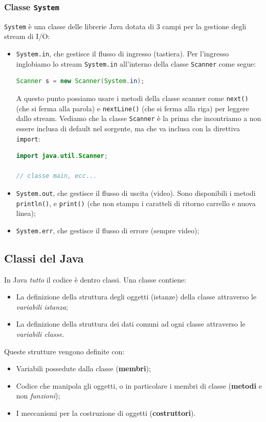 \documentclass[a4paper,11pt]{article}
\begin{document}
\subsubsection{Classe \lstinline|System|}
\lstinline|System| è una classe delle librerie Java dotata di 3 campi per la gestione degli stream di I/O:
\begin{itemize}
	\item \lstinline|System.in|, che gestisce il flusso di ingresso (tastiera).
		Per l'ingresso inglobiamo lo stream \lstinline|System.in| all'interno della classe \lstinline|Scanner| come segue:
\begin{lstlisting}[language=java, style=codestyle]	
Scanner s = new Scanner(System.in);
\end{lstlisting}
A questo punto possiamo usare i metodi della classe scanner come \lstinline|next()| (che si ferma alla parola) e \lstinline|nextLine()| (che si ferma alla riga) per leggere dallo stream.
Vediamo che la classe \lstinline|Scanner| è la prima che incontriamo a non essere inclusa di default nel sorgente, ma che va inclusa con la direttiva \lstinline|import|:
\begin{lstlisting}[language=java, style=codestyle]	
import java.util.Scanner;

// classe main, ecc... 
\end{lstlisting}
	\item \lstinline|System.out|, che gestisce il flusso di uscita (video). Sono disponibili i metodi \lstinline|println()|, e \lstinline|print()| (che non stampa i caratteli di ritorno carrello e nuova linea);
	\item \lstinline|System.err|, che gestisce il flusso di errore (sempre video);
\end{itemize}

\subsection{Classi del Java}
In Java \textit{tutto} il codice è dentro classi.
Una classe contiene:
\begin{itemize}
	\item La definizione della struttura degli oggetti (istanze) della classe attraverso le \textit{variabili istanza};
	\item La definizione della struttura dei dati comuni ad ogni classe attraverso le \textit{variabili classe}.
\end{itemize}
Queste strutture vengono definite con:
\begin{itemize}
	\item Variabili possedute dalla classe (\textbf{membri});
	\item Codice che manipola gli oggetti, o in particolare i membri di classe (\textbf{metodi} e non \textit{funzioni});
	\item I meccanismi per la costruzione di oggetti (\textbf{costruttori}).
\end{itemize}
\end{document}
